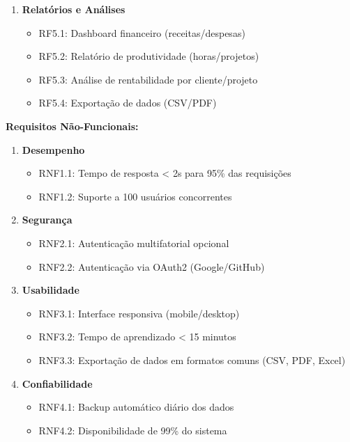 \documentclass[a4paper,12pt]{article}
\begin{document}
\begin{enumerate}[label=\textbf{RF\arabic*}, leftmargin=2.5cm]
  \item \textbf{Relatórios e Análises}
    \begin{itemize}[nosep]
      \item RF5.1: Dashboard financeiro (receitas/despesas)
      \item RF5.2: Relatório de produtividade (horas/projetos)
      \item RF5.3: Análise de rentabilidade por cliente/projeto
      \item RF5.4: Exportação de dados (CSV/PDF)
    \end{itemize}
\end{enumerate}

\textbf{Requisitos Não-Funcionais:}
\begin{enumerate}[label=\textbf{RNF\arabic*}, leftmargin=2.5cm]
  \item \textbf{Desempenho}
    \begin{itemize}[nosep]
      \item RNF1.1: Tempo de resposta < 2s para 95\% das requisições
      \item RNF1.2: Suporte a 100 usuários concorrentes
    \end{itemize}
  
  \item \textbf{Segurança}
    \begin{itemize}[nosep]
      \item RNF2.1: Autenticação multifatorial opcional
      \item RNF2.2: Autenticação via OAuth2 (Google/GitHub)
    \end{itemize}
  
  \item \textbf{Usabilidade}
    \begin{itemize}[nosep]
      \item RNF3.1: Interface responsiva (mobile/desktop)
      \item RNF3.2: Tempo de aprendizado < 15 minutos
      \item RNF3.3: Exportação de dados em formatos comuns (CSV, PDF, Excel)
    \end{itemize}
  
  \item \textbf{Confiabilidade}
    \begin{itemize}[nosep]
      \item RNF4.1: Backup automático diário dos dados
      \item RNF4.2: Disponibilidade de 99\% do sistema
    \end{itemize}
\end{enumerate}
\end{document}
